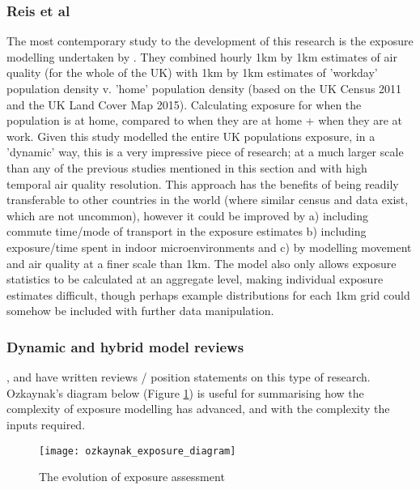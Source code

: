\subsubsection{Reis et al}
\label{sec:dynamic_models_reis}

The most contemporary study to the development of this research is the exposure modelling undertaken by \cite{Reis2018}. They combined hourly 1km by 1km estimates of air quality (for the whole of the UK) with 1km by 1km estimates of 'workday' population density v. 'home' population density (based on the UK Census 2011 and the UK Land Cover Map 2015). Calculating exposure for when the population is at home, compared to when they are at home + when they are at work. Given this study modelled the entire UK populations exposure, in a 'dynamic' way, this is a very impressive piece of research; at a much larger scale than any of the previous studies mentioned in this section and with high temporal air quality resolution. This approach has the benefits of being readily transferable to other countries in the world (where similar census and data exist, which are not uncommon), however it could be improved by a) including commute time/mode of transport in the exposure estimates b) including exposure/time spent in indoor microenvironments and c) by modelling movement and air quality at a finer scale than 1km. The model also only allows exposure statistics to be calculated at an aggregate level, making individual exposure estimates difficult, though perhaps example distributions for each 1km grid could somehow be included with further data manipulation.

\subsubsection{Dynamic and hybrid model reviews}
\label{sec:dynamic_models_reviews}

\cite{Ozkaynak2013}, \cite{Meliker2011} and \cite{Baxter2013} have written reviews / position statements on this type of research. Ozkaynak's diagram below (Figure \ref{fig:ozkaynak_exposure_diagram}) is useful for summarising how the complexity of exposure modelling has advanced, and with the complexity the inputs required.

\begin{figure}[H]
\centering
\texttt{[image: ozkaynak\_exposure\_diagram]}
\caption{The evolution of exposure assessment}
\label{fig:ozkaynak_exposure_diagram}
\end{figure}

